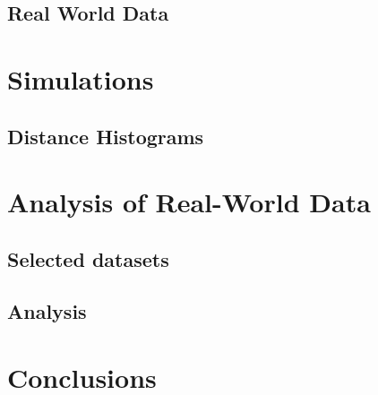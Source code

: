 \documentclass[11pt,oneside]{report}
\theoremstyle{definition}
\begin{document}
\section{Real World Data}


\chapter{Simulations}



\section{Distance Histograms}



\chapter{Analysis of Real-World Data}

\section{Selected datasets}

\section{Analysis}


\chapter{Conclusions}



\end{document}
